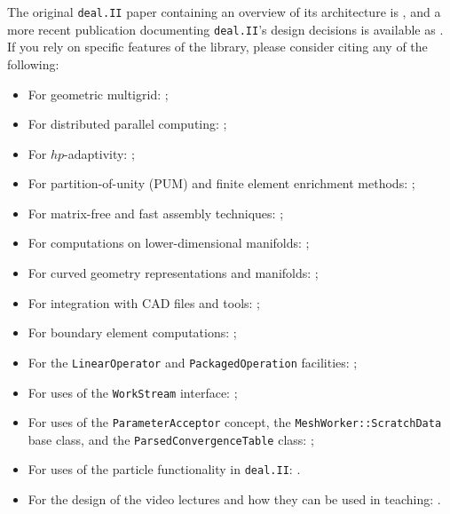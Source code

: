 \documentclass{ansarticle-preprint}
\newcommand{\specialword}[1]{\texttt{#1}}
\newcommand{\dealii}{{\specialword{deal.II}}\xspace}
\begin{document}
The original \dealii paper containing an overview of its
architecture is \cite{BangerthHartmannKanschat2007}, and a more recent
publication documenting \dealii's design decisions is available as \cite{dealII2020design}. If you rely on
specific features of the library, please consider citing any of the
following:
\begin{multicols}{2}
  \vspace*{-36pt}
  \begin{itemize}[leftmargin=4mm]
    \item For geometric multigrid: \cite{Kanschat2004,JanssenKanschat2011,ClevengerHeisterKanschatKronbichler2019, munch2022gc};
    \item For distributed parallel computing: \cite{BangerthBursteddeHeisterKronbichler11};
    \item For $hp$-adaptivity: \cite{BangerthKayserHerold2007,fehlingbangerth2023};
    \item For partition-of-unity (PUM) and finite element enrichment methods:
           \cite{Davydov2016};
    \item For matrix-free and fast assembly techniques:
          \cite{KronbichlerKormann2012,KronbichlerKormann2019};
    \item For computations on lower-dimensional manifolds:
          \cite{DeSimoneHeltaiManigrasso2009};
    \item For curved geometry representations and manifolds:
          \cite{HeltaiBangerthKronbichlerMola2019};
    \item For integration with CAD files and tools:
          \cite{HeltaiMola2015};
    \item For boundary element computations:
          \cite{GiulianiMolaHeltai-2018-a};
    \item For the \texttt{LinearOperator} and
      \texttt{Packaged\-Operation} facilities:
          \cite{MaierBardelloniHeltai-2016-a,MaierBardelloniHeltai-2016-b};
    \item For uses of the \texttt{WorkStream} interface:
          \cite{TKB16};
    \item For uses of the \texttt{ParameterAcceptor} concept, the
          \texttt{MeshWorker::ScratchData} base class, and the
          \texttt{ParsedConvergenceTable} class:
          \cite{SartoriGiulianiBardelloni-2018-a};
    \item For uses of the particle functionality in \dealii:
      \cite{GLHPB18}.
      \item For the design of the video lectures and how they can be
        used in teaching: \cite{Zarestky2022}.
          \vfill\null
  \end{itemize}
\end{multicols}
\end{document}
